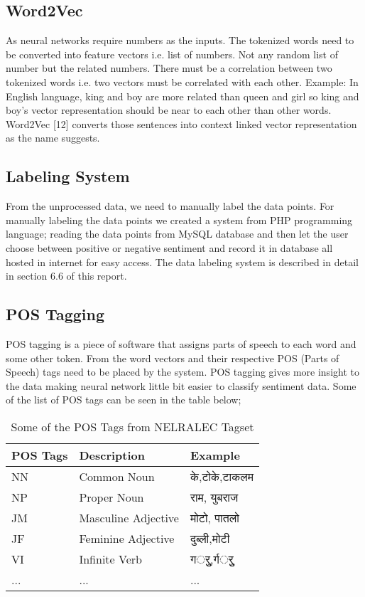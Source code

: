             \subsection{Word2Vec}
As neural networks require numbers as the inputs. The tokenized words need to be
converted into feature vectors i.e. list of numbers. Not any random list of number but
the related numbers. There must be a correlation between two tokenized words i.e. two
vectors must be correlated with each other. Example: In English language, king and
boy are more related than queen and girl so king and boy’s vector representation should
be near to each other than other words. Word2Vec
[12]
converts those sentences into
context linked vector representation as the name suggests.
            \subsection{Labeling System}
From the unprocessed data, we need to manually label the data points. For manually
labeling the data points we created a system from PHP programming language; reading
the data points from MySQL database and then let the user choose between positive or
negative sentiment and record it in database all hosted in internet for easy access. The
data labeling system is described in detail in section 6.6 of this report.
            \subsection{POS Tagging}
POS tagging is a piece of software that assigns parts of speech to each word and some
other token. From the word vectors and their respective POS (Parts of Speech) tags
need to be placed by the system. POS tagging gives more insight to the data making
neural network little bit easier to classify sentiment data. Some of the list of POS tags
can be seen in the table below;
    \begin{table}[hbt!]
        \centering
        \caption{Some of the POS Tags from NELRALEC Tagset}
       \begin{tabular}{|p{3cm}|p{5cm}|p{3cm}|}
            \hline
            \textbf{POS Tags} & \textbf{Description} & \textbf{Example} \\
            \hline
            NN & Common Noun &  के,टोके,टाकलम \\
            \hline
            NP & Proper Noun & राम, युबराज  \\
            \hline
            JM & Masculine Adjective & मोटो, पातलो \\
            \hline
            JF & Feminine Adjective  & दुब्ली,मोटी  \\
            \hline
             VI & Infinite Verb & गर्ुु,र्गर्ुु \\
            \hline
              ... & ... & ... \\
            \hline
        \end{tabular}
    \end{table}

